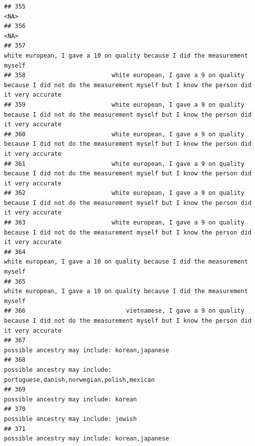\documentclass[]{article}
\begin{document}
\begin{verbatim}
## 355                                                                                                                                                <NA>
## 356                                                                                                                                                <NA>
## 357                                                                         white european, I gave a 10 on quality because I did the measurement myself
## 358                        white european, I gave a 9 on quality because I did not do the measurement myself but I know the person did it very accurate
## 359                        white european, I gave a 9 on quality because I did not do the measurement myself but I know the person did it very accurate
## 360                        white european, I gave a 9 on quality because I did not do the measurement myself but I know the person did it very accurate
## 361                        white european, I gave a 9 on quality because I did not do the measurement myself but I know the person did it very accurate
## 362                        white european, I gave a 9 on quality because I did not do the measurement myself but I know the person did it very accurate
## 363                        white european, I gave a 9 on quality because I did not do the measurement myself but I know the person did it very accurate
## 364                                                                         white european, I gave a 10 on quality because I did the measurement myself
## 365                                                                         white european, I gave a 10 on quality because I did the measurement myself
## 366                            vietnamese, I gave a 9 on quality because I did not do the measurement myself but I know the person did it very accurate
## 367                                                                                                      possible ancestry may include: korean,japanese
## 368                                                                           possible ancestry may include: portuguese,danish,norwegian,polish,mexican
## 369                                                                                                               possible ancestry may include: korean
## 370                                                                                                               possible ancestry may include: jewish
## 371                                                                                                      possible ancestry may include: korean,japanese

\end{verbatim}
\end{document}
